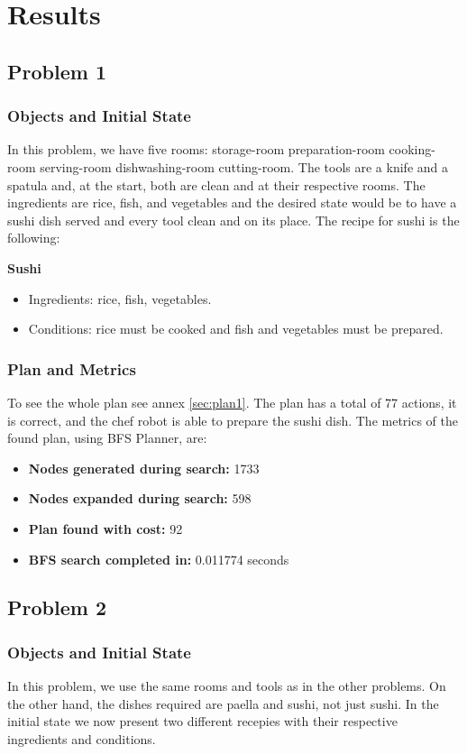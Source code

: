 \documentclass[a4paper,12pt]{article}
\begin{document}
\section{Results}
\subsection{Problem 1}
\subsubsection{Objects and Initial State}
In this problem, we have five rooms: storage-room preparation-room cooking-room serving-room dishwashing-room cutting-room. The tools are a knife and a spatula and, at the start, both are clean and at their respective rooms. The ingredients are rice, fish, and vegetables and the desired state would be to have a sushi dish served and every tool clean and on its place. The recipe for sushi is the following:

\textbf{Sushi}
\begin{itemize}
    \item Ingredients: rice, fish, vegetables.
    \item Conditions: rice must be cooked and fish and vegetables must be prepared.
\end{itemize}
\subsubsection{Plan and Metrics}
To see the whole plan see annex \ref{sec:plan1}. The plan has a total of 77 actions, it is correct, and the chef robot is able to prepare the sushi dish. The metrics of the found plan, using BFS Planner, are:

\begin{itemize}
    \item \textbf{Nodes generated during search:} 1733
    \item \textbf{Nodes expanded during search:} 598
    \item \textbf{Plan found with cost:} 92
    \item \textbf{BFS search completed in:} 0.011774 seconds
\end{itemize}



\subsection{Problem 2}
\subsubsection{Objects and Initial State}
In this problem, we use the same rooms and tools as in the other problems. On the other hand, the dishes required are paella and sushi, not just sushi. In the initial state we now present two different recepies with their respective ingredients and conditions.
\end{document}
